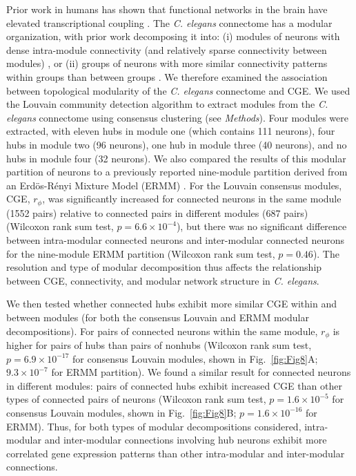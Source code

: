 \documentclass[10pt,letterpaper]{article}
\begin{document}
{Prior work in humans has shown that functional networks in the brain have elevated transcriptional coupling \cite{Richiardi2015}.
The \emph{C. elegans} connectome has a modular organization, with prior work decomposing it into:
(i) modules of neurons with dense intra-module connectivity (and relatively sparse connectivity between modules) \cite{Kim:2014bu, Pan:2010jt, Bassett2010}, or
(ii) groups of neurons with more similar connectivity patterns within groups than between groups \cite{Achacoso:1992ay, Pavlovic:2014gx}.
We therefore examined the association between topological modularity of the \emph{C. elegans} connectome and CGE.
We used the Louvain community detection algorithm \cite{Blondel:2008do} to extract modules from the \emph{C. elegans} connectome using consensus clustering (see \textit{Methods}).
Four modules were extracted, with eleven hubs in module one (which contains 111 neurons), four hubs in module two (96 neurons), one hub in module three (40 neurons), and no hubs in module four (32 neurons).
We also compared the results of this modular partition of neurons to a previously reported nine-module partition derived from an Erd\"os-R\'enyi Mixture Model (ERMM) \cite{Pavlovic:2014gx}.
For the Louvain consensus modules, CGE, $r_\phi$, was significantly increased for connected neurons in the same module (1552 pairs) relative to connected pairs in different modules (687 pairs) (Wilcoxon rank sum test, $p = 6.6 \times 10^{-4}$), but there was no significant difference between intra-modular connected neurons and inter-modular connected neurons for the nine-module ERMM partition (Wilcoxon rank sum test, $p = 0.46$).
The resolution and type of modular decomposition thus affects the relationship between CGE, connectivity, and modular network structure in \emph{C. elegans}.

We then tested whether connected hubs exhibit more similar CGE within and between modules (for both the consensus Louvain and ERMM modular decompositions).
For pairs of connected neurons within the same module, $r_\phi$ is higher for pairs of hubs than pairs of nonhubs (Wilcoxon rank sum test, $p = 6.9\times 10^{-17}$ for consensus Louvain modules, shown in Fig.~\ref{fig:Fig8}A; $9.3 \times 10^{-7}$ for ERMM partition).
We found a similar result for connected neurons in different modules: pairs of connected hubs exhibit increased CGE than other types of connected pairs of neurons (Wilcoxon rank sum test, $p = 1.6 \times 10^{-5}$ for consensus Louvain modules, shown in Fig.~\ref{fig:Fig8}B; $p = 1.6 \times 10^{-16}$ for ERMM).
Thus, for both types of modular decompositions considered, intra-modular and inter-modular connections involving hub neurons exhibit more correlated gene expression patterns than other intra-modular and inter-modular connections.

}
\end{document}
